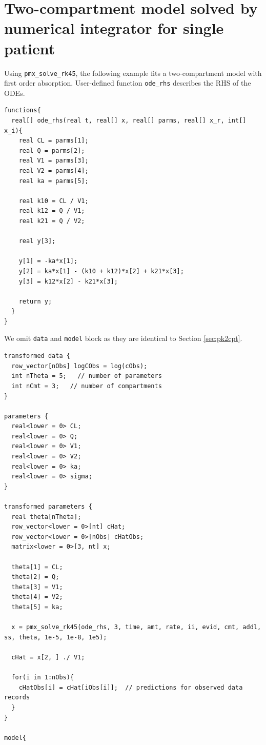 \documentclass[10pt, reqno, oneside]{amsbook}
\numberwithin{equation}{chapter}
\numberwithin{figure}{chapter}
\numberwithin{table}{chapter}
\theoremstyle{remark}
\begin{document}
\section{Two-compartment model solved by numerical integrator for single patient}
\label{sec:org233170c}
Using \texttt{pmx\_solve\_rk45}, the following example fits a two-compartment model
with first order absorption. User-defined function
\texttt{ode\_rhs} describes the RHS of the ODEs. 
\begin{verbatim}
functions{
  real[] ode_rhs(real t, real[] x, real[] parms, real[] x_r, int[] x_i){
    real CL = parms[1];
    real Q = parms[2];
    real V1 = parms[3];
    real V2 = parms[4];
    real ka = parms[5];

    real k10 = CL / V1;
    real k12 = Q / V1;
    real k21 = Q / V2;

    real y[3];

    y[1] = -ka*x[1];
    y[2] = ka*x[1] - (k10 + k12)*x[2] + k21*x[3];
    y[3] = k12*x[2] - k21*x[3];

    return y;
  }
}
\end{verbatim}

We omit \texttt{data} and
\texttt{model} block as they are identical to Section \ref{sec:pk2cpt}.

\begin{verbatim}
transformed data {
  row_vector[nObs] logCObs = log(cObs);
  int nTheta = 5;   // number of parameters
  int nCmt = 3;   // number of compartments
}

parameters {
  real<lower = 0> CL;
  real<lower = 0> Q;
  real<lower = 0> V1;
  real<lower = 0> V2;
  real<lower = 0> ka;
  real<lower = 0> sigma;
}

transformed parameters {
  real theta[nTheta];
  row_vector<lower = 0>[nt] cHat;
  row_vector<lower = 0>[nObs] cHatObs;
  matrix<lower = 0>[3, nt] x; 

  theta[1] = CL;
  theta[2] = Q;
  theta[3] = V1;
  theta[4] = V2;
  theta[5] = ka;

  x = pmx_solve_rk45(ode_rhs, 3, time, amt, rate, ii, evid, cmt, addl, ss, theta, 1e-5, 1e-8, 1e5);

  cHat = x[2, ] ./ V1;

  for(i in 1:nObs){
    cHatObs[i] = cHat[iObs[i]];  // predictions for observed data records
  }
}

model{
\end{verbatim}
\end{document}

